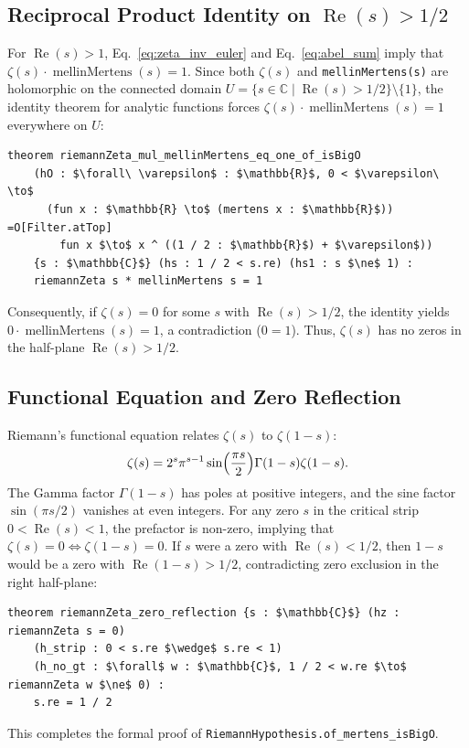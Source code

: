 \documentclass[11pt,a4paper]{article}
\theoremstyle{definition}
\newcommand{\Cfield}{\mathbb{C}}
\begin{document}
\subsection{Reciprocal Product Identity on \texorpdfstring{$\operatorname{Re}(s) > 1/2$}{Re(s) > 1/2}}
For $\operatorname{Re}(s) > 1$, Eq.~\eqref{eq:zeta_inv_euler} and Eq.~\eqref{eq:abel_sum} imply that $\zeta(s) \cdot \operatorname{mellinMertens}(s) = 1$. Since both $\zeta(s)$ and \texttt{mellinMertens(s)} are holomorphic on the connected domain $U = \{s \in \Cfield \mid \operatorname{Re}(s) > 1/2\} \setminus \{1\}$, the identity theorem for analytic functions forces $\zeta(s) \cdot \operatorname{mellinMertens}(s) = 1$ everywhere on $U$:
\begin{lstlisting}
theorem riemannZeta_mul_mellinMertens_eq_one_of_isBigO
    (hO : $\forall\ \varepsilon$ : $\mathbb{R}$, 0 < $\varepsilon\ \to$
      (fun x : $\mathbb{R} \to$ (mertens x : $\mathbb{R}$)) =O[Filter.atTop]
        fun x $\to$ x ^ ((1 / 2 : $\mathbb{R}$) + $\varepsilon$))
    {s : $\mathbb{C}$} (hs : 1 / 2 < s.re) (hs1 : s $\ne$ 1) :
    riemannZeta s * mellinMertens s = 1
\end{lstlisting}
Consequently, if $\zeta(s) = 0$ for some $s$ with $\operatorname{Re}(s) > 1/2$, the identity yields $0 \cdot \operatorname{mellinMertens}(s) = 1$, a contradiction ($0 = 1$). Thus, $\zeta(s)$ has no zeros in the half-plane $\operatorname{Re}(s) > 1/2$.

\subsection{Functional Equation and Zero Reflection}
Riemann's functional equation relates $\zeta(s)$ to $\zeta(1-s)$:
\begin{equation}
\label{eq:functional_eq}
\zeta(s) = 2^s \pi^{s-1} \sin\Bigl(\frac{\pi s}{2}\Bigr) \Gamma(1-s) \zeta(1-s).
\end{equation}
The Gamma factor $\Gamma(1-s)$ has poles at positive integers, and the sine factor $\sin(\pi s / 2)$ vanishes at even integers. For any zero $s$ in the critical strip $0 < \operatorname{Re}(s) < 1$, the prefactor is non-zero, implying that $\zeta(s) = 0 \iff \zeta(1-s) = 0$. If $s$ were a zero with $\operatorname{Re}(s) < 1/2$, then $1-s$ would be a zero with $\operatorname{Re}(1-s) > 1/2$, contradicting zero exclusion in the right half-plane:
\begin{lstlisting}
theorem riemannZeta_zero_reflection {s : $\mathbb{C}$} (hz : riemannZeta s = 0)
    (h_strip : 0 < s.re $\wedge$ s.re < 1)
    (h_no_gt : $\forall$ w : $\mathbb{C}$, 1 / 2 < w.re $\to$ riemannZeta w $\ne$ 0) :
    s.re = 1 / 2
\end{lstlisting}
This completes the formal proof of \texttt{RiemannHypothesis.of\_mertens\_isBigO}.
\end{document}
